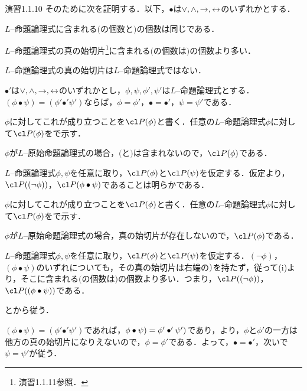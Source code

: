 \begin{excfield}{演習1.1.10}
  そのために次を証明する．以下，$\bullet$は$\lor, \land, \ra, \lra$のいずれかとする．
  \begin{lem}
    \begin{thmlist}[n]
      \item \label{i_1_10_lem_preq}
      $L$--命題論理式に含まれる$($の個数と$)$の個数は同じである．
      \item \label{i_1_10_lem_prg}
      $L$--命題論理式の真の始切片\footnote{演習1.1.11参照．}に含まれる$($の個数は$)$の個数より多い．
      \item \label{i_1_10_lem_iniseg}
      $L$--命題論理式の真の始切片は$L$--命題論理式ではない．
      \item \label{i_1_10_lem_conn}
      $\bullet'$は$\lor, \land , \ra, \lra$のいずれかとし，$\phi, \psi, \phi', \psi'$は$L$--命題論理式とする．$(\phi \bullet \psi) = (\phi' \mathbin{\bullet'} \psi')$ならば，$\phi = \phi'$，$\bullet = \bullet'$，$\psi = \psi'$である．
    \end{thmlist}

    \tcblower

    \begin{myenum}[n]
      \item $\phi$に対してこれが成り立つことを$\cl P (\phi)$と書く．任意の$L$--命題論理式$\phi$に対して$\cl P (\phi)$をで示す．
      \begin{step}
        \item $\phi$が$L$--原始命題論理式の場合，$($と$)$は含まれないので，$\cl P (\phi)$である．
        \item $L$--命題論理式$\phi, \psi$を任意に取り，$\cl P (\phi)$と$\cl P (\psi)$を仮定する．仮定より，$\cl P ((\lnot \phi))$，$\cl P (\phi \bullet \psi)$であることは明らかである．
      \end{step}
      \item $\phi$に対してこれが成り立つことを$\cl P (\phi)$と書く．任意の$L$--命題論理式$\phi$に対して$\cl P (\phi)$をで示す．
      \begin{step}
        \item $\phi$が$L$--原始命題論理式の場合，真の始切片が存在しないので，$\cl P (\phi)$である．
        \item $L$--命題論理式$\phi, \psi$を任意に取り，$\cl P (\phi)$と$\cl P (\psi)$を仮定する．$(\lnot \phi)$，$(\phi \bullet \psi)$のいずれについても，その真の始切片は右端の$\noprint{(})$を持たず，従って(i)より，そこに含まれる$($の個数は$)$の個数より多い．つまり，$\cl P ((\lnot \phi))$，$\cl P ((\phi \bullet \psi))$である．
      \end{step}
      \item {}とから従う．
      \item $(\phi \bullet \psi) = (\phi' \mathbin{\bullet'} \psi')$であれば，$\noprint{(}\phi \bullet \psi) = \noprint{(}\phi' \mathbin{\bullet'} \psi')$であり，より，$\phi$と$\phi'$の一方は他方の真の始切片になりえないので，$\phi = \phi'$である．よって，$\bullet = \bullet'$，次いで$\psi = \psi'$が従う．
    \end{myenum}
  \end{lem}


\end{excfield}
